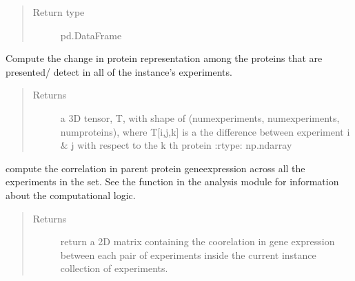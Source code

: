 \documentclass[letterpaper,10pt,english]{sphinxmanual}
\begin{document}
\begin{fulllineitems}
\begin{fulllineitems}
\begin{quote}
\begin{description}
\item[{Return type}] \leavevmode
pd.DataFrame

\end{description}\end{quote}

\end{fulllineitems}


\begin{fulllineitems}
\label{\detokenize{IPTK.Classes:IPTK.Classes.ExperimentalSet.ExperimentSet.compute_change_in_protein_representation}}
Compute the change in protein representation among the proteins that are presented/ detect in all of the         instance’s experiments.
\begin{quote}\begin{description}
\item[{Returns}] \leavevmode
a 3D tensor, T, with shape of (num\sphinxhyphen{}experiments, num\sphinxhyphen{}experiments, num\sphinxhyphen{}proteins),         where T{[}i,j,k{]} is a the difference between experiment i \& j with respect to the k th protein         :rtype: np.ndarray

\end{description}\end{quote}

\end{fulllineitems}


\begin{fulllineitems}
\label{\detokenize{IPTK.Classes:IPTK.Classes.ExperimentalSet.ExperimentSet.compute_correlation_in_experssion}}
compute the correlation in parent protein gene\sphinxhyphen{}expression across all the experiments
in the set. See the function  in the analysis module 
for information about the computational logic.
\begin{quote}\begin{description}
\item[{Returns}] \leavevmode
return a 2D matrix containing the coorelation in gene expression between each pair of experiments inside the current instance collection of experiments.


\end{description}
\end{quote}
\end{fulllineitems}
\end{fulllineitems}
\end{document}

